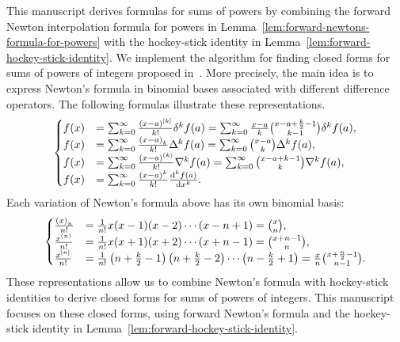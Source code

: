 This manuscript derives formulas for sums of powers by combining the forward Newton interpolation formula for powers in Lemma~\eqref{lem:forward-newtons-formula-for-powers} with the hockey-stick identity in Lemma~\eqref{lem:forward-hockey-stick-identity}. We implement the algorithm for finding closed forms for sums of powers of integers proposed in~\cite[Algorithm (11.2)]{kolosov2026framework}. More precisely, the main idea is to express Newton's formula in binomial bases associated with different difference operators. The following formulas illustrate these representations.
\begin{align*}
  \begin{cases}
    f(x)
    &= \sum_{k=0}^{\infty} \frac{(x-a)^{[k]}}{k!} \delta^{k} f(a)
    = \sum_{k=0}^{\infty} \frac{x-a}{k} \binom{x-a+\frac{k}{2}-1}{k-1} \delta^{k} f(a), \\
    f(x)
    &= \sum_{k=0}^{\infty} \frac{\left(x-a\right)_{k}}{k!} \Delta^k f(a)
    = \sum_{k=0}^{\infty} \binom{x-a}{k} \Delta^k f(a), \\
    f(x)
    &= \sum_{k=0}^{\infty} \frac{(x-a)^{\left(k\right)}}{k!} \nabla^k f(a)
    = \sum_{k=0}^{\infty} \binom{x-a+k-1}{k} \nabla^k f(a), \\
    f(x)
    &= \sum_{k=0}^{\infty} \frac{(x-a)^k}{k!} \frac{\mathrm{d}^{k} f(a)}{\mathrm{d} x^{k}}.
  \end{cases}
\end{align*}
Each variation of Newton's formula above has its own binomial basis:
\begin{align*}
  \begin{cases}
    \frac{\left(x\right)_{n}}{n!} &= \frac{1}{n!} x(x-1)(x-2)\cdots(x-n+1) =\binom{x}{n}, \\
    \frac{x^{\left(n\right)}}{n!}  &= \frac{1}{n!} x(x+1)(x+2)\cdots(x+n-1)  =\binom{x+n-1}{n}, \\
    \frac{x^{[n]}}{n!} &= \frac{1}{n!} \left( n + \frac{k}{2} -1 \right)\left( n + \frac{k}{2} -2 \right)
    \cdots \left( n - \frac{k}{2} +1 \right)  =\frac{x}{n} \binom{x+\frac{n}{2}-1}{n-1}.
  \end{cases}
\end{align*}
These representations allow us to combine Newton's formula with hockey-stick identities to derive closed forms for sums of powers of integers. This manuscript focuses on these closed forms, using forward Newton's formula and the hockey-stick identity in Lemma~\eqref{lem:forward-hockey-stick-identity}.
